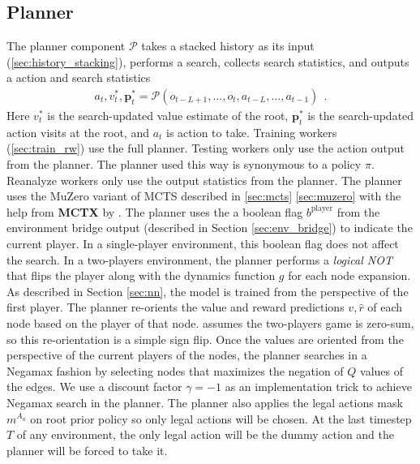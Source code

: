 \subsection{Planner} \label{sec:planner}
The planner component $\mathcal{P}$ takes a stacked history as its input (\ref{sec:history_stacking}), performs a search, collects search statistics, and outputs a action and search statistics
\begin{align*}
    a_t, v^*_t, \mathbf{p}^*_t = \mathcal{P}(o_{t - L + 1}, \dots, o_t, a_{t - L}, \dots, a_{t - 1}) ~~ .
\end{align*}
Here $v^*_t$ is the search-updated value estimate of the root, $\mathbf{p}^*_t$ is the search-updated action visits at the root, and $a_t$ is action to take.
Training workers (\ref{sec:train_rw}) use the full planner.
Testing workers only use the action output from the planner.
The planner used this way is synonymous to a policy $\pi$.
Reanalyze workers only use the output statistics from the planner.
The planner uses the MuZero variant of MCTS described in \ref{sec:mcts} \ref{sec:muzero} with the help from \textbf{MCTX} by \citeauthor{POLICYIMPROVEMENTPLANNING_Danihelka.Guez.ea_2022} \cite{POLICYIMPROVEMENTPLANNING_Danihelka.Guez.ea_2022}.
The planner uses the a boolean flag $b^{\text{player}}$ from the environment bridge output (described in Section \ref{sec:env_bridge}) to indicate the current player.
In a single-player environment, this boolean flag does not affect the search.
In a two-players environment, the planner performs a \textit{logical NOT} that flips the player along with the dynamics function \(g\) for each node expansion.
As described in Section \ref{sec:nn}, the model is trained from the perspective of the first player.
The planner re-orients the value and reward predictions $v, \hat{r}$ of each node based on the player of that node.
\moozi assumes the two-players game is zero-sum, so this re-orientation is a simple sign flip.
Once the values are oriented from the perspective of the current players of the nodes, the planner searches in a Negamax fashion by selecting nodes that maximizes the negation of $Q$ values of the edges.
We use a discount factor $\gamma = -1$ as an implementation trick to achieve Negamax search in the planner. 
The planner also applies the legal actions mask $m^{A_a}$ on root prior policy so only legal actions will be chosen.
At the last timestep $T$ of any environment, the only legal action will be the dummy action and the planner will be forced to take it.


